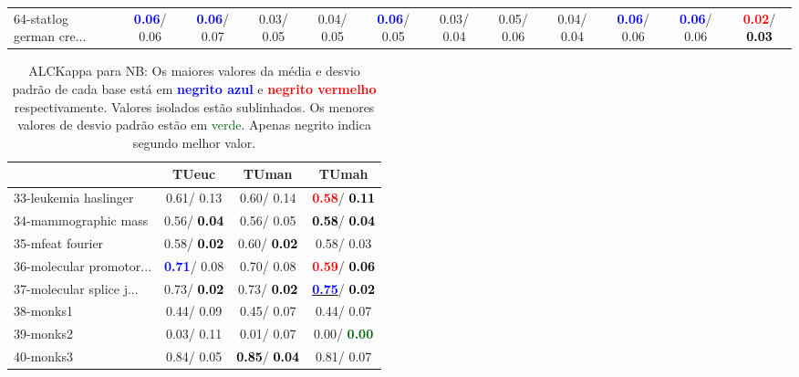 \begin{table}[h]
\begin{center}
{\begin{tabular}{lc|c|c|c|c|c|c|c|c|c|c}
64-statlog german cre... & \textcolor{blue}{\textbf{  0.06}}/  0.06 & \textcolor{blue}{\textbf{  0.06}}/  0.07 &   0.03/  0.05 &   0.04/  0.05 & \textcolor{blue}{\textbf{  0.06}}/  0.05 &   0.03/  0.04 &   0.05/  0.06 &   0.04/  0.04 & \textcolor{blue}{\textbf{  0.06}}/  0.06 & \textcolor{blue}{\textbf{  0.06}}/  0.06 & \textcolor{red}{\textbf{  0.02}}/\textcolor{black}{\textbf{  0.03}} \\\end{tabular}}\label{stratsALCKappa1aNBRedux}
\end{center}
\end{table}
\begin{table}[h]
\caption{ALCKappa para NB: Os maiores valores da média e desvio padrão de cada base está em \textcolor{blue}{\textbf{negrito azul}} e \textcolor{red}{\textbf{negrito vermelho}} respectivamente. Valores isolados estão sublinhados. Os menores valores de desvio padrão estão em \textcolor{darkgreen}{verde}. Apenas negrito indica segundo melhor valor.}
\begin{center}\begin{tabular}{lc|c|c}
 & TUeuc & TUman & TUmah\\ \hline 33-leukemia haslinger &   0.61/  0.13 &   0.60/  0.14 & \textcolor{red}{\textbf{  0.58}}/\textcolor{black}{\textbf{  0.11}} \\
34-mammographic mass &   0.56/\textcolor{black}{\textbf{  0.04}} &   0.56/  0.05 & \textcolor{black}{\textbf{  0.58}}/\textcolor{black}{\textbf{  0.04}} \\
35-mfeat fourier &   0.58/\textcolor{black}{\textbf{  0.02}} &   0.60/\textcolor{black}{\textbf{  0.02}} &   0.58/  0.03 \\
36-molecular promotor... & \textcolor{blue}{\textbf{  0.71}}/  0.08 &   0.70/  0.08 & \textcolor{red}{\textbf{  0.59}}/\textcolor{black}{\textbf{  0.06}} \\
37-molecular splice j... &   0.73/\textcolor{black}{\textbf{  0.02}} &   0.73/\textcolor{black}{\textbf{  0.02}} & \underline{\textcolor{blue}{\textbf{  0.75}}}/\textcolor{black}{\textbf{  0.02}} \\
38-monks1 &   0.44/  0.09 &   0.45/  0.07 &   0.44/  0.07 \\
39-monks2 &   0.03/  0.11 &   0.01/  0.07 &   0.00/\textcolor{darkgreen}{\textbf{  0.00}} \\ \hline
40-monks3 &   0.84/  0.05 & \textcolor{black}{\textbf{  0.85}}/\textcolor{black}{\textbf{  0.04}} &   0.81/  0.07 \\

\end{tabular}
\end{center}
\end{table}
